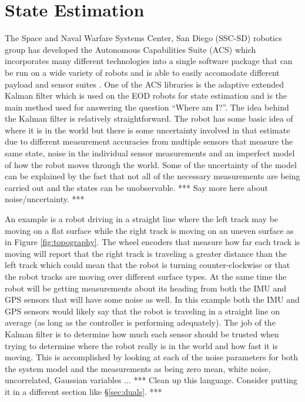 \chapter{State Estimation}
\label{ch:estimation}
The Space and Naval Warfare Systems Center, San Diego (SSC-SD) robotics group has developed the Autonomous Capabilities Suite (ACS) which incorporates many different technologies into a single software package that can be run on a wide variety of robots and is able to easily accomodate different payload and sensor suites \cite{Sights06}. One of the ACS libraries is the adaptive extended Kalman filter which is used on the EOD robots for state estimation and is the main method used for answering the question ``Where am I?''. The idea behind the Kalman filter is relatively straightforward. The robot has some basic idea of where it is in the world but there is some uncertainty involved in that estimate due to different measurement accuracies from multiple sensors that measure the same state, noise in the individual sensor measurements and an imperfect model of how the robot moves through the world. Some of the uncertainty of the model can be explained by the fact that not all of the necessary measurements are being carried out and the states can be unobservable. *** Say more here about noise/uncertainty. ***

An example is a robot driving in a straight line where the left track may be moving on a flat surface while the right track is moving on an uneven surface as in Figure \ref{fig:topography}. The wheel encoders that measure how far each track is moving will report that the right track is traveling a greater distance than the left track which could mean that the robot is turning counter-clockwise or that the robot tracks are moving over different surface types. At the same time the robot will be getting measurements about its heading from both the IMU and GPS sensors that will have some noise as well. In this example both the IMU and GPS sensors would likely say that the robot is traveling in a straight line on average (as long as the controller is performing adequately). The job of the Kalman filter is to determine how much each sensor should be trusted when trying to determine where the robot really is in the world and how fast it is moving. This is accomplished by looking at each of the noise parameters for both the system model and the measurements as being zero mean, white noise, uncorrelated, Gaussian variables ... *** Clean up this language. Consider putting it in a different section like \S\ref{sec:duals}. ***

